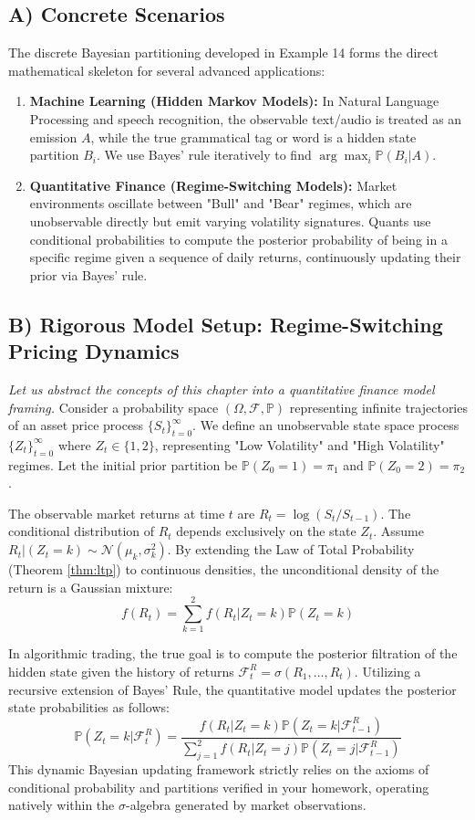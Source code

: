 \documentclass[12pt, a4paper]{article}
\theoremstyle{definition}
\theoremstyle{remark}
\newcommand{\Prob}{\mathbb{P}}
\newcommand{\F}{\mathcal{F}}
\newcommand{\W}{\Omega}
\newcommand{\1}{\mathbf{1}}
\begin{document}
\subsection{A) Concrete Scenarios}
The discrete Bayesian partitioning developed in Example 14 forms the direct mathematical skeleton for several advanced applications:
\begin{enumerate}
    \item \textbf{Machine Learning (Hidden Markov Models):} In Natural Language Processing and speech recognition, the observable text/audio is treated as an emission $A$, while the true grammatical tag or word is a hidden state partition $B_i$. We use Bayes' rule iteratively to find $\arg\max_i \Prob(B_i | A)$.
    \item \textbf{Quantitative Finance (Regime-Switching Models):} Market environments oscillate between "Bull" and "Bear" regimes, which are unobservable directly but emit varying volatility signatures. Quants use conditional probabilities to compute the posterior probability of being in a specific regime given a sequence of daily returns, continuously updating their prior via Bayes' rule.
\end{enumerate}

\subsection{B) Rigorous Model Setup: Regime-Switching Pricing Dynamics}
\textit{Let us abstract the concepts of this chapter into a quantitative finance model framing.}
Consider a probability space $(\W, \F, \Prob)$ representing infinite trajectories of an asset price process $\{S_t\}_{t=0}^\infty$.
We define an unobservable state space process $\{Z_t\}_{t=0}^\infty$ where $Z_t \in \{1, 2\}$, representing "Low Volatility" and "High Volatility" regimes. Let the initial prior partition be $\Prob(Z_0 = 1) = \pi_1$ and $\Prob(Z_0 = 2) = \pi_2$.

The observable market returns at time $t$ are $R_t = \log(S_t/S_{t-1})$. The conditional distribution of $R_t$ depends exclusively on the state $Z_t$. Assume $R_t | (Z_t = k) \sim \mathcal{N}(\mu_k, \sigma_k^2)$.
By extending the Law of Total Probability (Theorem \ref{thm:ltp}) to continuous densities, the unconditional density of the return is a Gaussian mixture:
\[ f(R_t) = \sum_{k=1}^2 f(R_t | Z_t = k)\Prob(Z_t = k) \]

In algorithmic trading, the true goal is to compute the posterior filtration of the hidden state given the history of returns $\F_t^R = \sigma(R_1, \dots, R_t)$. Utilizing a recursive extension of Bayes' Rule, the quantitative model updates the posterior state probabilities as follows:
\[ \Prob(Z_t = k | \F_t^R) = \frac{f(R_t | Z_t = k) \Prob(Z_t = k | \F_{t-1}^R)}{\sum_{j=1}^2 f(R_t | Z_t = j) \Prob(Z_t = j | \F_{t-1}^R)} \]
This dynamic Bayesian updating framework strictly relies on the axioms of conditional probability and partitions verified in your homework, operating natively within the $\sigma$-algebra generated by market observations.
\end{document}
